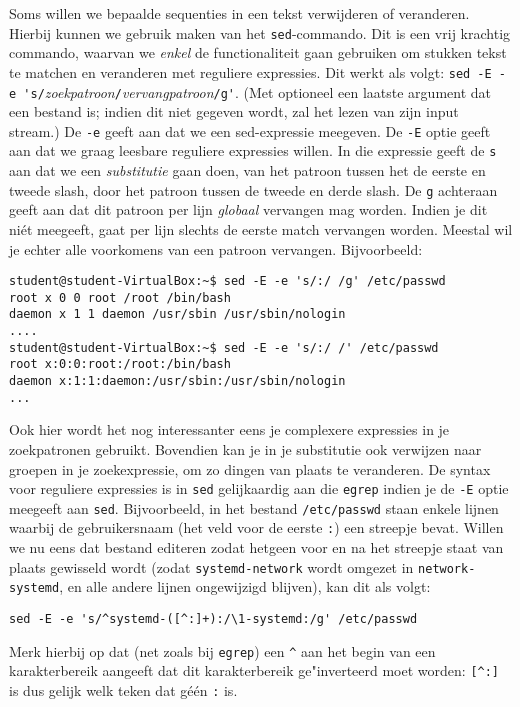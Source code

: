 \documentclass[a4paper,twoside,openany]{memoir}
\begin{document}
Soms willen we bepaalde sequenties in een tekst verwijderen of veranderen.
Hierbij kunnen we gebruik maken van het \verb!sed!-commando. Dit is een vrij
krachtig commando, waarvan we \emph{enkel} de functionaliteit gaan gebruiken om
stukken tekst te matchen en veranderen met reguliere expressies. Dit werkt als
volgt: \verb!sed -E -e 's/!\emph{zoekpatroon}\verb!/!\emph{vervangpatroon}\verb!/g'!. (Met optioneel
een laatste argument dat een bestand is; indien dit niet gegeven wordt, zal het
lezen van zijn input stream.) De \verb!-e! geeft aan dat we een sed-expressie
meegeven. De \verb!-E! optie geeft aan dat we graag leesbare reguliere expressies willen.
In die expressie geeft de \verb!s! aan dat we een \emph{substitutie}
gaan doen, van het patroon tussen het de eerste en tweede slash, door het
patroon tussen de tweede en derde slash. De \verb!g! achteraan geeft aan dat dit
patroon per lijn \emph{globaal} vervangen mag worden. Indien je dit niét
meegeeft, gaat per lijn slechts de eerste match vervangen worden. Meestal wil je
echter alle voorkomens van een patroon vervangen. Bijvoorbeeld:

\begin{verbatim}
student@student-VirtualBox:~$ sed -E -e 's/:/ /g' /etc/passwd
root x 0 0 root /root /bin/bash
daemon x 1 1 daemon /usr/sbin /usr/sbin/nologin
....
student@student-VirtualBox:~$ sed -E -e 's/:/ /' /etc/passwd
root x:0:0:root:/root:/bin/bash
daemon x:1:1:daemon:/usr/sbin:/usr/sbin/nologin
...
\end{verbatim}

Ook hier wordt het nog interessanter eens je complexere expressies in je
zoekpatronen gebruikt. Bovendien kan je in je substitutie ook verwijzen naar
groepen in je zoekexpressie, om zo dingen van plaats te veranderen.
De syntax voor reguliere expressies is in \verb!sed! gelijkaardig aan die \verb!egrep!
indien je de \verb!-E! optie meegeeft aan \verb!sed!.
Bijvoorbeeld, in het bestand \verb!/etc/passwd! staan enkele lijnen waarbij de
gebruikersnaam (het veld voor de eerste \verb!:!) een streepje bevat. Willen we
nu eens dat bestand editeren zodat hetgeen voor en na het streepje staat van
plaats gewisseld wordt (zodat \verb!systemd-network! wordt omgezet in
\verb!network-systemd!, en alle andere lijnen ongewijzigd blijven), kan dit als
volgt:

\begin{verbatim}
sed -E -e 's/^systemd-([^:]+):/\1-systemd:/g' /etc/passwd
\end{verbatim}

Merk hierbij op dat (net zoals bij \verb!egrep!) een \verb!^! aan het begin van
een karakterbereik aangeeft dat dit karakterbereik ge"inverteerd moet worden:
\verb![^:]! is dus gelijk welk teken dat géén \verb!:! is.
\end{document}
